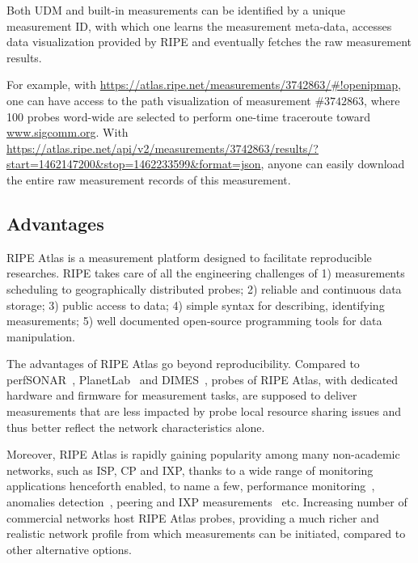 Both \ac{UDM} and built-in measurements can be identified by a unique measurement ID, with which one learns the measurement meta-data, accesses data visualization provided by RIPE and eventually fetches the raw measurement results.

For example, with \url{https://atlas.ripe.net/measurements/3742863/#!openipmap}, one can have access to the path visualization of measurement $\#3742863$, where 100 probes word-wide are selected to perform one-time traceroute toward \url{www.sigcomm.org}. 
With \url{https://atlas.ripe.net/api/v2/measurements/3742863/results/?start=1462147200&stop=1462233599&format=json}, anyone can easily download the entire raw measurement records of this measurement.

\subsection{Advantages}
RIPE Atlas is a measurement platform designed to facilitate reproducible researches. 
RIPE takes care of all the engineering challenges of 1) measurements scheduling to geographically distributed probes; 2) reliable and continuous data storage; 3) public access to data; 4) simple syntax for describing, identifying measurements; 5) well documented open-source programming tools for data manipulation.

The advantages of RIPE Atlas go beyond reproducibility. 
Compared to perfSONAR~\cite{perfSONAR}, PlanetLab~\cite{PlanetLab} and DIMES~\cite{DIMES}, probes of RIPE Atlas, with dedicated hardware and firmware for measurement tasks, are supposed to deliver measurements that are less impacted by probe local resource sharing issues and thus better reflect the network characteristics alone.

Moreover, RIPE Atlas is rapidly gaining popularity among many non-academic networks, such as \ac{ISP}, \ac{CP} and \ac{IXP}, thanks to a wide range of monitoring applications henceforth enabled, to name a few, performance monitoring~\cite{latencymon, Rimondini2014}, anomalies detection~\cite{Fontugne2016, Padmanabhan, halo}, peering and IXP measurements~\cite{ixp, routeixp} etc. 
Increasing number of commercial networks host RIPE Atlas probes, providing a much richer and realistic network profile from which measurements can be initiated, compared to other alternative options.

